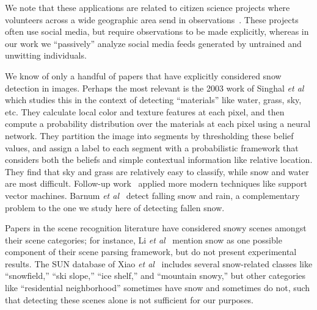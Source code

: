\documentclass[10pt,journal,compsoc]{IEEEtran}
\begin{document}
We note that these applications are related to citizen science
projects where volunteers across a wide geographic area send 
in observations~\cite{greatsunflower,ebirds,king09snowtweets}. These projects
often use social media, but require observations to be made
explicitly, whereas in our work we ``passively'' analyze social
media feeds generated by untrained and unwitting individuals.

 We know of only a handful of
papers that have explicitly considered snow detection in
images. Perhaps the most relevant is the 2003 work of Singhal
\textit{et al}~\cite{singhal2003spatialcontext,luo2003spatialcontext}
which studies this in the context of detecting ``materials'' like
water, grass, sky, etc. They calculate local color and texture
features at each pixel, and then compute a probability
distribution over the materials at each pixel using a neural
network. They partition the image into segments by thresholding these
belief values, and assign a label to each segment with a probabilistic
framework that considers both the beliefs and simple
contextual information like relative location.
 They find that sky and grass
are relatively easy to classify, while snow and water are
most difficult.  Follow-up work~\cite{boutell2006semanticfeature,boutell2005exploiting}
applied more modern techniques like
support vector machines.  Barnum \textit{et al}~\cite{rain2009IJCV}
detect falling snow and rain, a complementary problem
to the one we study here of detecting fallen
snow.

Papers in the scene recognition literature have considered
snowy scenes amongst their scene categories; for instance, Li \textit{et
  al}~\cite{li2009totalscene,li2007event} mention snow as one possible
component of their scene parsing framework, but do not present
experimental results. The SUN database of Xiao \textit{et
  al}~\cite{XiaoHEOT10} includes several snow-related classes like
``snowfield,'' ``ski slope,'' ``ice shelf,'' and ``mountain snowy,''
but other categories like ``residential neighborhood'' sometimes have
snow and sometimes do not, such that detecting these scenes alone
is not sufficient for our purposes. 
\end{document}
